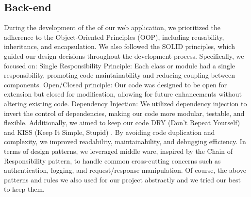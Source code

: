 \subsection{Back-end}\label{back}
\hspace*{0.5cm} During the development of the  of our web application, we prioritized the adherence to the Object-Oriented Principles (OOP), including reusability, inheritance, and encapsulation. We also followed the SOLID principles, which guided our design decisions throughout the development process. Specifically, we focused on: Single Responsibility Principle: Each class or module had a single responsibility, promoting code maintainability and reducing coupling between components.
Open/Closed principle: Our code was designed to be open for extension but closed for modification, allowing for future enhancements without altering existing code.
Dependency Injection: We utilized dependency injection to invert the control of dependencies, making our code more modular, testable, and flexible.
Additionally, we aimed to keep our code DRY (Don't Repeat Yourself) \cite{dry} and KISS (Keep It Simple, Stupid) \cite{kiss}. By avoiding code duplication and complexity, we improved readability, maintainability, and debugging efficiency. In terms of design patterns, we leveraged middle ware, inspired by the Chain of Responsibility pattern, to handle common cross-cutting concerns such as authentication, logging, and request/response manipulation. Of course, the above patterns and rules we also used for our project abstractly and we tried our best to keep them.

\newpage
